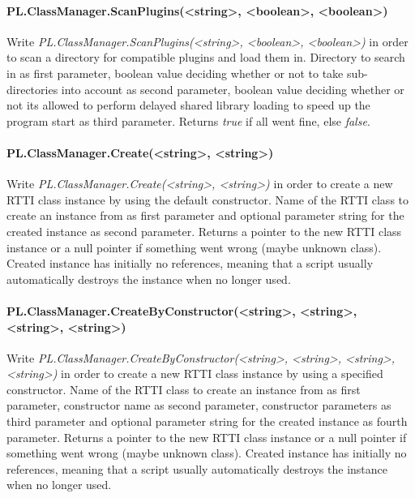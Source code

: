 \paragraph{PL.ClassManager.ScanPlugins(<string>, <boolean>, <boolean>)}
Write \emph{PL.ClassManager.ScanPlugins(<string>, <boolean>, <boolean>)} in order to scan a directory for compatible plugins and load them in. Directory to search in as first parameter, boolean value deciding whether or not to take sub-directories into account as second parameter, boolean value deciding whether or not its allowed to perform delayed shared library loading to speed up the program start as third parameter. Returns \emph{true} if all went fine, else \emph{false}.

\paragraph{PL.ClassManager.Create(<string>, <string>)}
Write \emph{PL.ClassManager.Create(<string>, <string>)} in order to create a new RTTI class instance by using the default constructor. Name of the RTTI class to create an instance from as first parameter and optional parameter string for the created instance as second parameter. Returns a pointer to the new RTTI class instance or a null pointer if something went wrong (maybe unknown class). Created instance has initially no references, meaning that a script usually automatically destroys the instance when no longer used.

\paragraph{PL.ClassManager.CreateByConstructor(<string>, <string>, <string>, <string>)}
Write \emph{PL.ClassManager.CreateByConstructor(<string>, <string>, <string>, <string>)} in order to create a new RTTI class instance by using a specified constructor. Name of the RTTI class to create an instance from as first parameter, constructor name as second parameter, constructor parameters as third parameter and optional parameter string for the created instance as fourth parameter. Returns a pointer to the new RTTI class instance or a null pointer if something went wrong (maybe unknown class). Created instance has initially no references, meaning that a script usually automatically destroys the instance when no longer used.
